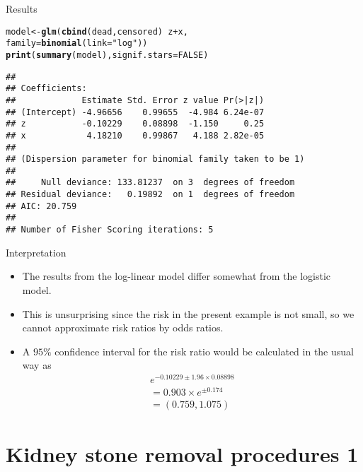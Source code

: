 \documentclass[10pt,handout]{beamer}\usepackage[]{graphicx}\usepackage[]{color}
\makeatletter
\newcommand{\hlnum}[1]{\textcolor[rgb]{0.686,0.059,0.569}{#1}}%
\newcommand{\hlstr}[1]{\textcolor[rgb]{0.192,0.494,0.8}{#1}}%
\newcommand{\hlopt}[1]{\textcolor[rgb]{0,0,0}{#1}}%
\newcommand{\hlstd}[1]{\textcolor[rgb]{0.345,0.345,0.345}{#1}}%
\newcommand{\hlkwb}[1]{\textcolor[rgb]{0.69,0.353,0.396}{#1}}%
\newcommand{\hlkwc}[1]{\textcolor[rgb]{0.333,0.667,0.333}{#1}}%
\newcommand{\hlkwd}[1]{\textcolor[rgb]{0.737,0.353,0.396}{\textbf{#1}}}%
\newenvironment{kframe}{%
 \def\at@end@of@kframe{}%
 \ifinner\ifhmode%
  \def\at@end@of@kframe{\end{minipage}}%
  \begin{minipage}{\columnwidth}%
 \fi\fi%
 \def\FrameCommand##1{\hskip\@totalleftmargin \hskip-\fboxsep
 \colorbox{shadecolor}{##1}\hskip-\fboxsep
     \hskip-\linewidth \hskip-\@totalleftmargin \hskip\columnwidth}%
 \MakeFramed {\advance\hsize-\width
   \@totalleftmargin\z@ \linewidth\hsize
   \@setminipage}}%
 {\par\unskip\endMakeFramed%
 \at@end@of@kframe}
\newenvironment{knitrout}{}{} %
\makeatother
\begin{document}
\begin{frame}[fragile]{Results}
\begin{knitrout}
\color{fgcolor}\begin{kframe}
\begin{alltt}
\hlstd{model} \hlkwb{<-} \hlkwd{glm}\hlstd{(}\hlkwd{cbind}\hlstd{(dead,censored)} \hlopt{~} \hlstd{z} \hlopt{+} \hlstd{x,}
             \hlkwc{family}\hlstd{=}\hlkwd{binomial}\hlstd{(}\hlkwc{link}\hlstd{=}\hlstr{"log"}\hlstd{))}
\hlkwd{print}\hlstd{(}\hlkwd{summary}\hlstd{(model),} \hlkwc{signif.stars} \hlstd{=} \hlnum{FALSE}\hlstd{)}
\end{alltt}
\begin{verbatim}
## 
## Coefficients:
##             Estimate Std. Error z value Pr(>|z|)
## (Intercept) -4.96656    0.99655  -4.984 6.24e-07
## z           -0.10229    0.08898  -1.150     0.25
## x            4.18210    0.99867   4.188 2.82e-05
## 
## (Dispersion parameter for binomial family taken to be 1)
## 
##     Null deviance: 133.81237  on 3  degrees of freedom
## Residual deviance:   0.19892  on 1  degrees of freedom
## AIC: 20.759
## 
## Number of Fisher Scoring iterations: 5
\end{verbatim}
\end{kframe}
\end{knitrout}
\end{frame}



\begin{frame}[fragile]{Interpretation}
	\begin{itemize}
		\item The results from the log-linear model differ somewhat from the logistic model.
		\item This is unsurprising since the risk in the present example is not small, so we cannot approximate risk ratios by odds ratios.
		\item A $95 \%$ confidence interval for the risk ratio would be
		calculated in the usual way as
		$$
		\begin{array}{l}
		e^{-0.10229 \pm 1.96 \times 0.08898} \\
		=0.903 \times e^{\pm 0.174} \\
		=(0.759,1.075)
		\end{array}
		$$
	\end{itemize}
\end{frame}




\section{Kidney stone removal procedures 1}
\end{document}
